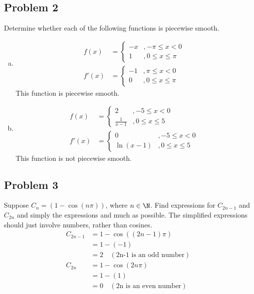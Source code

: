 \documentclass{math}
\begin{document}
\subsection*{Problem 2}
Determine whether each of the following functions is piecewise smooth.
\begin{enumerate}[(a)]
  \item
  \begin{align*}
    f(x) &= \begin{cases}
      -x &, -\pi\le x<0 \\
      1 &, 0\le x\le\pi
    \end{cases} \\
    f'(x) &= \begin{cases}
      -1 &, \pi\le x<0 \\
      0 &, 0\le x\le\pi
    \end{cases}
  \end{align*}
  This function is piecewise smooth.
  \item
  \begin{align*}
    f(x) &= \begin{cases}
      2 &, -5\le x<0 \\
      \frac{1}{x-1} &, 0\le x\le 5
    \end{cases} \\
    f'(x) &= \begin{cases}
      0 &, -5\le x<0 \\
      \ln(x-1) &, 0\le x\le 5
    \end{cases}
  \end{align*}
  This function is not piecewise smooth.
\end{enumerate}

\subsection*{Problem 3}
Suppose \( C_n = (1-\cos(n\pi)) \), where \( n\in\N \). Find expressions for
\( C_{2n-1} \) and \( C_{2n} \) and simply the expressions and much as possible.
The simplified expressions should just involve numbers, rather than cosines.
\begin{align*}
  C_{2n-1} &= 1-\cos((2n-1)\pi) \\
  &= 1-(-1) \\
  &= 2 \quad (\text{2n-1 is an odd number}) \\
  C_{2n} &= 1-\cos(2n\pi) \\
  &= 1-(1) \\
  &= 0 \quad (\text{2n is an even number})
\end{align*}
\end{document}
